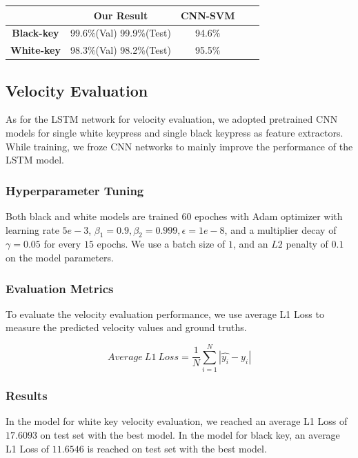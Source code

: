 \documentclass[10pt,twocolumn,letterpaper]{article}
\begin{document}
\begin{minipage}{\linewidth}
   \centering
\begin{tabular}{ccccc}
   \toprule
   & Our Result & CNN-SVM\\
   \midrule
   \textbf{Black-key} &99.6\%(Val) 99.9\%(Test)& 94.6\%\\
   \textbf{White-key} &98.3\%(Val) 98.2\%(Test)& 95.5\%\\
   \bottomrule
   \end{tabular}
    \label{tab:prevdataset}

\end{minipage}

\subsection{Velocity Evaluation}

As for the LSTM network for velocity evaluation, we adopted pretrained CNN models for single white keypress and single black keypress as feature extractors. While training, we froze CNN networks to mainly improve the performance of the LSTM model.

\subsubsection{Hyperparameter Tuning}

Both black and white models are trained \(60\) epoches with Adam optimizer with learning rate \(5e-3\), \(\beta_1 = 0.9, \beta_2 = 0.999, \epsilon = 1e-8\), and a multiplier decay of \(\gamma=0.05\) for every $15$ epochs. We use a batch size of \(1\), and an \(L2\) penalty of \(0.1\) on the model parameters.

\subsubsection{Evaluation Metrics}

To evaluate the velocity evaluation performance, we use average L1 Loss to measure the predicted velocity values and ground truths.

\[Average\ L1\ Loss = \frac{1}{N}\sum_{i=1}^{N}|\widehat{y_i} - y_i|\]

\subsubsection{Results}

In the model for white key velocity evaluation, we reached an average L1 Loss of \(17.6093\) on test set with the best model. In the model for black key, an average L1 Loss of \(11.6546\) is reached on test set with the best model.\\
\end{document}
